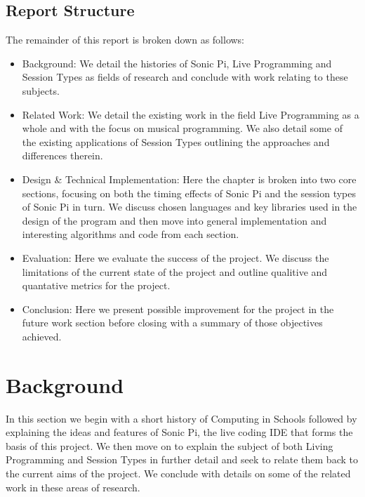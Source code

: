 \documentclass[11pt]{scrartcl}
\begin{document}
\subsection{Report Structure}
The remainder of this report is broken down as follows:

\begin{itemize}
	\item Background: We detail the histories of Sonic Pi, Live Programming 
	and Session Types as fields of research and conclude with work relating to
	these subjects.
	\item Related Work: We detail the existing work in the field Live Programming
	as a whole and with the focus on musical programming. We also detail some
	of the existing applications of Session Types outlining the approaches and
	differences therein.
	\item Design \& Technical Implementation: Here the chapter is broken into
	two core sections, focusing on both the timing effects of Sonic Pi and
	the session types of Sonic Pi in turn. We discuss chosen languages and key
	libraries used in the design of the program and then move into general
	implementation and interesting algorithms and code from each section.
	\item Evaluation: Here we evaluate the success of the project. We discuss
	the limitations of the current state of the project and outline qualitive
	and quantative metrics for the project.
	\item Conclusion: Here we present possible improvement for the project in
	the future work section before closing with a summary of those objectives
	achieved.
\end{itemize}
\newpage

\section{Background}
In this section we begin with a short history of Computing in Schools followed 
by explaining the ideas and features of Sonic Pi, the live coding IDE that forms 
the basis of this project. We then move on to explain the subject of both Living 
Programming and Session Types in further detail and seek to relate them back to 
the current aims of the project. We conclude with details on some of the related 
work in these areas of research.
\end{document}
